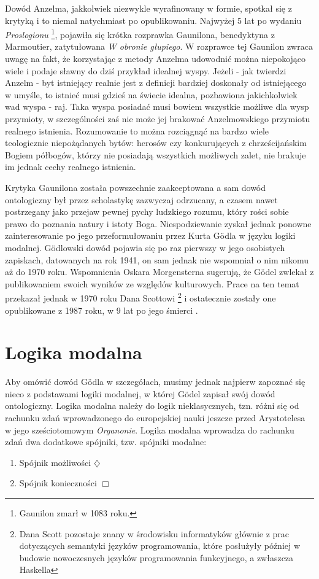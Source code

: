 \documentclass{article}
\begin{document}
Dowód Anzelma, jakkolwiek niezwykle wyrafinowany w formie, spotkał się z krytyką i to niemal natychmiast po opublikowaniu. Najwyżej 5 lat po wydaniu \emph{Proslogionu} \footnote{Gaunilon zmarł w 1083 roku.}, pojawiła się krótka rozprawka Gaunilona, benedyktyna z Marmoutier, zatytułowana \emph{W obronie głupiego}. W rozprawce tej Gaunilon zwraca uwagę na fakt, że korzystając z metody Anzelma udowodnić można niepokojąco wiele i podaje sławny do dziś przykład idealnej wyspy. Jeżeli - jak twierdzi Anzelm - byt istniejący realnie jest z definicji bardziej doskonały od istniejącego w umyśle, to istnieć musi gdzieś na świecie idealna, pozbawiona jakichkolwiek wad wyspa - raj. Taka wyspa posiadać musi bowiem wszystkie możliwe dla wysp przymioty, w szczególności zaś nie może jej brakować Anzelmowskiego przymiotu realnego istnienia. Rozumowanie to można rozciągnąć na bardzo wiele teologicznie niepożądanych bytów: herosów czy konkurujących z chrześcijańskim Bogiem półbogów, którzy nie posiadają wszystkich możliwych zalet, nie brakuje im jednak cechy realnego istnienia. 

Krytyka Gaunilona została powszechnie zaakceptowana a sam dowód ontologiczny był przez scholastykę zazwyczaj odrzucany, a czasem nawet postrzegany jako przejaw pewnej pychy ludzkiego rozumu, który rości sobie prawo do poznania natury i istoty Boga. Niespodziewanie zyskał jednak ponowne zainteresowanie po jego przeformułowaniu przez Kurta Gödla w języku logiki modalnej. Gödlowski dowód pojawia się po raz pierwszy w jego osobistych zapiskach, datowanych na rok 1941, on sam jednak nie wspomniał o nim nikomu aż do 1970 roku. Wspomnienia Oskara Morgensterna sugerują, że Gödel zwlekał z publikowaniem swoich wyników ze względów kulturowych. Prace na ten temat przekazał jednak w 1970 roku Dana Scottowi \footnote{Dana Scott pozostaje znany w środowisku informatyków głównie z prac dotyczących semantyki języków programowania, które posłużyły później w budowie nowoczesnych języków programowania funkcyjnego, a zwłaszcza Haskella} i ostatecznie zostały one opublikowane z 1987 roku, w 9 lat po jego śmierci \cite{godel1995}. 

\section{Logika modalna} \label{sec:modal-logic}

Aby omówić dowód Gödla w szczegółach, musimy jednak najpierw zapoznać się nieco z podstawami logiki modalnej, w której Gödel zapisał swój dowód ontologiczny. Logika modalna należy do logik nieklasycznych, tzn. różni się od rachunku zdań wprowadzonego do europejskiej nauki jeszcze przed Arystotelesa w jego sześciotomowym \emph{Organonie}. Logika modalna wprowadza do rachunku zdań dwa dodatkowe spójniki, tzw. spójniki modalne:
\begin{enumerate}
	\item Spójnik możliwości $\diamondsuit$
	\item Spójnik konieczności $\Box$
\end{enumerate}
\end{document}
